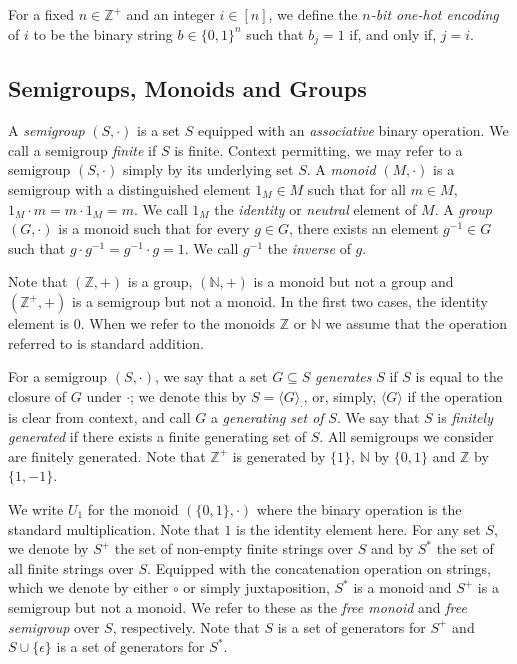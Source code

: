 \documentclass[a4paper,UKenglish,cleveref, autoref, thm-restate, anonymous]{lipics-v2021}
\begin{document}
For a fixed $n \in \mathbb{Z}^+$ and an integer $i \in [n]$, we define the \emph{$n$-bit one-hot encoding} of $i$ to be the binary string $b \in \{0,1\}^n$ such that $b_j = 1$ if, and only if,  $j = i$.

\subsection{Semigroups, Monoids and Groups}
\label{sec:backgroundsemi}

A \emph{semigroup} $(S, \cdot)$ is a set $S$ equipped with an \emph{associative} binary operation.  We call a semigroup \emph{finite} if $S$ is finite. Context permitting, we may refer to a semigroup $(S, \cdot)$ simply by its underlying set $S$.  A \emph{monoid} $(M, \cdot)$ is a semigroup with a distinguished element $1_M \in M$ such that for all $m \in M$, $1_M \cdot m = m \cdot 1_M = m$.  We call $1_M$ the \emph{identity} or \emph{neutral} element of $M$.  A \emph{group} $(G, \cdot)$ is a monoid such that for every $g \in G$, there exists an element $g^{-1} \in G$ such that $g \cdot g^{-1} = g^{-1} \cdot g = 1$.  We call $g^{-1}$ the \emph{inverse} of $g$.  

Note that $(\mathbb{Z},+)$ is a group, $(\mathbb{N},+)$ is a monoid but not a group and $(\mathbb{Z}^+,+)$ is a semigroup but not a monoid.  In the first two cases, the identity element is $0$.  When we refer to the monoids $\mathbb{Z}$ or $\mathbb{N}$ we assume that the operation referred to is standard addition.

For a semigroup $(S, \cdot)$, we say that a set $G \subseteq S$ \emph{generates} $S$ if $S$ is equal to the closure of $G$ under $\cdot$; we denote this by $S = \langle G \rangle_{\cdot}$, or, simply, $\langle G \rangle$ if the operation is clear from context, and call $G$ a \emph{generating set of} $S$. We say that $S$ is \emph{finitely generated} if there exists a finite generating set of $S$.  All semigroups we consider are finitely generated.  Note that $\mathbb{Z}^+$ is generated by $\{1\}$, $\mathbb{N}$ by $\{0,1\}$ and $\mathbb{Z}$ by $\{1,-1\}$.

We write $U_1$ for the monoid $(\{0,1\},\cdot)$ where the binary operation is the standard multiplication.  Note that $1$ is the identity element here.
For any set $S$, we denote by $S^+$ the set of non-empty finite strings over $S$ and by $S^*$ the set of all finite strings over $S$.  Equipped with the concatenation operation on strings, which we denote by either $\circ$ or simply juxtaposition, $S^*$ is a monoid and $S^+$ is a semigroup but not a monoid.  We refer to these as the \emph{free monoid} and \emph{free semigroup} over $S$, respectively.  Note that $S$ is a set of generators for $S^+$ and $S \cup \{\epsilon\}$ is a set of generators for $S^*$.
\end{document}
